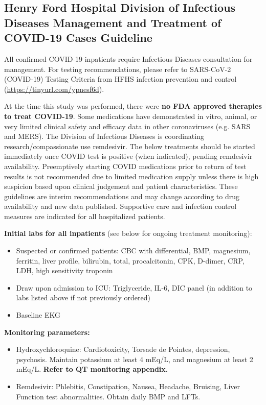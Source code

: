 \subsection{Henry Ford Hospital Division of Infectious Diseases Management and Treatment of COVID-19 Cases Guideline}


All confirmed COVID-19 inpatients require Infectious Diseases consultation for management. For testing recommendations, please refer to SARS-CoV-2 (COVID-19) Testing Criteria from HFHS infection prevention and control (\url{https://tinyurl.com/ypnesf6d}).


At the time this  study was performed, there were \textbf{no FDA approved therapies to treat COVID-19}. Some medications have demonstrated in vitro, animal, or very limited clinical safety and efficacy data in other coronaviruses (e.g. SARS and MERS). The Division of Infectious Diseases is coordinating research/compassionate use remdesivir. The below treatments should be started immediately once COVID test is positive (when indicated), pending remdesivir availability.  Preemptively starting COVID medications prior to return of test results is not recommended due to limited medication supply unless there is high suspicion based upon clinical judgement and patient characteristics.  These guidelines are interim recommendations and may change according to drug availability and new data published. Supportive care and infection control measures are indicated for all hospitalized patients.

\textbf{Initial labs for all inpatients} (see below for ongoing treatment monitoring): 
\begin{itemize}
\item Suspected or confirmed patients: CBC with differential, BMP, magnesium, ferritin, liver profile, bilirubin, total, procalcitonin, CPK, D-dimer, CRP, LDH, high sensitivity troponin
\item Draw upon admission to ICU: Triglyceride, IL-6, DIC panel (in addition to labs listed above if not previously ordered)
\item Baseline EKG
\end{itemize}

\textbf{Monitoring parameters:}
\begin{itemize}
\item Hydroxychloroquine: Cardiotoxicity, Torsade de Pointes, depression, psychosis. Maintain potassium at least 4 mEq/L, and magnesium at least 2 mEq/L. \textbf{Refer to QT monitoring appendix.} 
\item Remdesivir: Phlebitis, Constipation, Nausea, Headache, Bruising, Liver Function test abnormalities. Obtain daily BMP and LFTs. 
\end{itemize}





